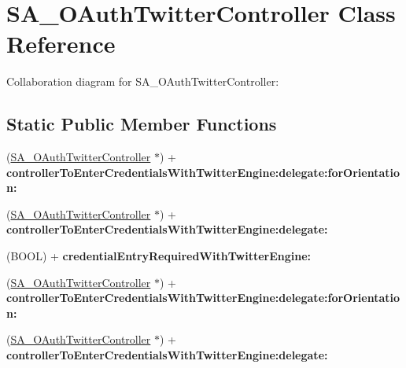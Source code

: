 \hypertarget{interface_s_a___o_auth_twitter_controller}{
\section{\-S\-A\-\_\-\-O\-Auth\-Twitter\-Controller \-Class \-Reference}
\label{interface_s_a___o_auth_twitter_controller}
}


\-Collaboration diagram for \-S\-A\-\_\-\-O\-Auth\-Twitter\-Controller\-:
\subsection*{\-Static \-Public \-Member \-Functions}
\begin{DoxyCompactItemize}
\item 
\hypertarget{interface_s_a___o_auth_twitter_controller_a80920decaf29b26add55d34c1f9789f7}{
(\hyperlink{interface_s_a___o_auth_twitter_controller}{\-S\-A\-\_\-\-O\-Auth\-Twitter\-Controller} $\ast$) + {\bfseries controller\-To\-Enter\-Credentials\-With\-Twitter\-Engine\-:delegate\-:for\-Orientation\-:}}
\label{interface_s_a___o_auth_twitter_controller_a80920decaf29b26add55d34c1f9789f7}

\item 
\hypertarget{interface_s_a___o_auth_twitter_controller_a4718f438f7767bcffedd1c485943c7b7}{
(\hyperlink{interface_s_a___o_auth_twitter_controller}{\-S\-A\-\_\-\-O\-Auth\-Twitter\-Controller} $\ast$) + {\bfseries controller\-To\-Enter\-Credentials\-With\-Twitter\-Engine\-:delegate\-:}}
\label{interface_s_a___o_auth_twitter_controller_a4718f438f7767bcffedd1c485943c7b7}

\item 
\hypertarget{interface_s_a___o_auth_twitter_controller_a249eccafa1a9642701c551a56624fb73}{
(\-B\-O\-O\-L) + {\bfseries credential\-Entry\-Required\-With\-Twitter\-Engine\-:}}
\label{interface_s_a___o_auth_twitter_controller_a249eccafa1a9642701c551a56624fb73}

\item 
\hypertarget{interface_s_a___o_auth_twitter_controller_a80920decaf29b26add55d34c1f9789f7}{
(\hyperlink{interface_s_a___o_auth_twitter_controller}{\-S\-A\-\_\-\-O\-Auth\-Twitter\-Controller} $\ast$) + {\bfseries controller\-To\-Enter\-Credentials\-With\-Twitter\-Engine\-:delegate\-:for\-Orientation\-:}}
\label{interface_s_a___o_auth_twitter_controller_a80920decaf29b26add55d34c1f9789f7}

\item 
\hypertarget{interface_s_a___o_auth_twitter_controller_a4718f438f7767bcffedd1c485943c7b7}{
(\hyperlink{interface_s_a___o_auth_twitter_controller}{\-S\-A\-\_\-\-O\-Auth\-Twitter\-Controller} $\ast$) + {\bfseries controller\-To\-Enter\-Credentials\-With\-Twitter\-Engine\-:delegate\-:}}
\label{interface_s_a___o_auth_twitter_controller_a4718f438f7767bcffedd1c485943c7b7}


\end{DoxyCompactItemize}
